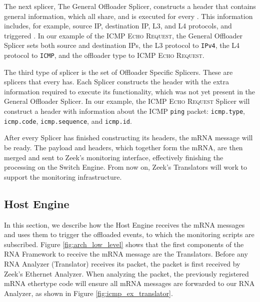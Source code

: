 
The next splicer, The General Offloader Splicer, constructs a header that contains general information, which all \Offloaders{} share, and is executed for every \Offloader{}. This information includes, for example, source IP, destination IP, L3, and L4 protocols, and triggered \Offloader{}. In our example of the ICMP \textsc{Echo Request}, the General Offloader Splicer sets both source and destination IPs, the L3 protocol to \texttt{IPv4}, the L4 protocol to \texttt{ICMP}, and the offloader type to \textsc{ICMP Echo Request}.

The third type of splicer is the set of Offloader Specific Splicers. These are splicers that every \Offloader{} has. Each \Offloader{} Splicer constructs the header with the extra information required to execute its functionality, which was not yet present in the General Offloader Splicer. In our example, the \textsc{ICMP Echo Request} Splicer will construct a header with information about the ICMP \texttt{ping} packet: \texttt{icmp.type}, \texttt{icmp.code}, \texttt{icmp.sequence}, and \texttt{icmp.id}.



After every Splicer has finished constructing its headers, the mRNA message will be ready. The payload and headers, which together form the mRNA, are then merged and sent to Zeek's monitoring interface, effectively finishing the processing on the Switch Engine. From now on, Zeek's Translators will work to support the monitoring infrastructure.

\subsection{Host Engine}

In this section, we describe how the Host Engine receives the mRNA messages and uses them to trigger the offloaded events, to which the monitoring scripts are subscribed. Figure \ref{fig:arch_low_level} shows that the first components of the RNA Framework to receive the mRNA message are the Translators. Before any RNA Analyzer (Translator) receives its packet, the packet is first received by Zeek's Ethernet Analyzer. When analyzing the packet, the previously registered mRNA ethertype code will ensure all mRNA messages are forwarded to our RNA Analyzer, as shown in Figure \ref{fig:icmp_ex_translator}.

